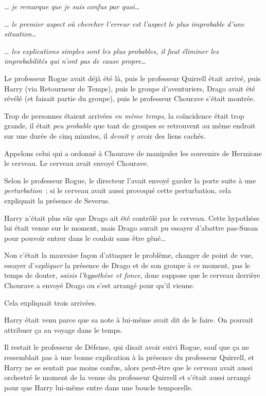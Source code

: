 \emph{… je remarque que je suis confus par quoi…}

\emph{… le premier aspect où chercher l'erreur est l'aspect le plus improbable d'une situation…}

\emph{… les explications simples sont les plus probables, il faut éliminer les improbabilités qui n'ont pas de cause propre…}

Le professeur Rogue avait déjà été là, puis le professeur Quirrell était arrivé, puis Harry (via Retourneur de Temps), puis le groupe d'aventuriers, Drago avait été révélé (et faisait partie du groupe), puis le professeur Chourave s'était montrée.

Trop de personnes étaient arrivées \emph{en même temps}, la coïncidence était trop grande, il était \emph{peu probable} que tant de groupes se retrouvent au même endroit sur une durée de cinq minutes, il \emph{devait} y avoir des liens cachés.

Appelons celui qui a ordonné à Chourave de manipuler les souvenirs de Hermione le cerveau. Le cerveau avait envoyé Chourave.

Selon le professeur Rogue, le directeur l'avait envoyé garder la porte suite à une \emph{perturbation}~; si le cerveau avait aussi provoqué cette perturbation, cela expliquait la présence de Severus.

Harry n'était plus sûr que Drago ait été contrôlé par le cerveau. Cette hypothèse lui était venue sur le moment, mais Drago aurait pu essayer d'abattre pas-Susan pour pouvoir entrer dans le couloir sans être gêné…

Non c'était la mauvaise façon d'attaquer le problème, changer de point de vue, essayer d'\emph{expliquer} la présence de Drago et de son groupe à ce moment, pas le temps de douter, \emph{saisis l'hypothèse et fonce}, donc suppose que le cerveau derrière Chourave a envoyé Drago ou s'est arrangé pour qu'il vienne.

Cela expliquait trois arrivées.

Harry était venu parce que sa note à lui-même avait dit de le faire. On pouvait attribuer ça au voyage dans le temps.

Il restait le professeur de Défense, qui disait avoir suivi Rogue, sauf que ça ne ressemblait pas à une bonne explication à la présence du professeur Quirrell, et Harry ne se sentait pas moins confus, alors peut-être que le cerveau avait aussi orchestré le moment de la venue du professeur Quirrell et s'était aussi arrangé pour que Harry lui-même entre dans une boucle temporelle.


